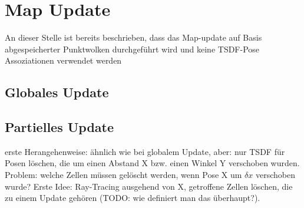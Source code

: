 \chapter{Map Update}
\label{chapter:map_update}

An dieser Stelle ist bereits beschrieben, dass das Map-update auf Basis abgespeicherter Punktwolken durchgeführt wird und keine TSDF-Pose Assoziationen verwendet werden

\section{Globales Update}

\section{Partielles Update}

erste Herangehenweise: ähnlich wie bei globalem Update, aber: nur TSDF für Posen löschen, die um einen Abstand X bzw. einen Winkel Y verschoben wurden. Problem: welche Zellen müssen gelöscht werden, wenn Pose X um $\delta x$ verschoben wurde? Erste Idee: Ray-Tracing ausgehend von X, getroffene Zellen löschen, die zu einem Update gehören (TODO: wie definiert man das überhaupt?).

